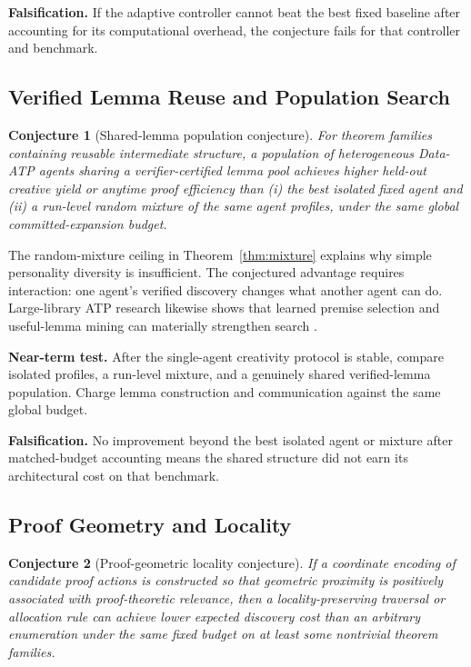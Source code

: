 \documentclass[11pt]{article}
\theoremstyle{datatheorem}
\newtheorem{conjecture}{Conjecture}[section]
\theoremstyle{definition}
\begin{document}
\textbf{Falsification.} If the adaptive controller cannot beat the best fixed baseline after accounting for its computational overhead, the conjecture fails for that controller and benchmark.

\clearpage
\subsection{Verified Lemma Reuse and Population Search}

\begin{conjecture}[Shared-lemma population conjecture]\label{conj:lemmas}
For theorem families containing reusable intermediate structure, a population of heterogeneous Data-ATP agents sharing a verifier-certified lemma pool achieves higher held-out creative yield or anytime proof efficiency than (i) the best isolated fixed agent and (ii) a run-level random mixture of the same agent profiles, under the same global committed-expansion budget.
\end{conjecture}

The random-mixture ceiling in Theorem~\ref{thm:mixture} explains why simple personality diversity is insufficient. The conjectured advantage requires interaction: one agent's verified discovery changes what another agent can do. Large-library ATP research likewise shows that learned premise selection and useful-lemma mining can materially strengthen search \cite{kaliszyk2014,kaliszyk2015}.

\textbf{Near-term test.} After the single-agent creativity protocol is stable, compare isolated profiles, a run-level mixture, and a genuinely shared verified-lemma population. Charge lemma construction and communication against the same global budget.

\textbf{Falsification.} No improvement beyond the best isolated agent or mixture after matched-budget accounting means the shared structure did not earn its architectural cost on that benchmark.

\clearpage
\subsection{Proof Geometry and Locality}

\begin{conjecture}[Proof-geometric locality conjecture]\label{conj:geometry}
If a coordinate encoding of candidate proof actions is constructed so that geometric proximity is positively associated with proof-theoretic relevance, then a locality-preserving traversal or allocation rule can achieve lower expected discovery cost than an arbitrary enumeration under the same fixed budget on at least some nontrivial theorem families.
\end{conjecture}
\end{document}

